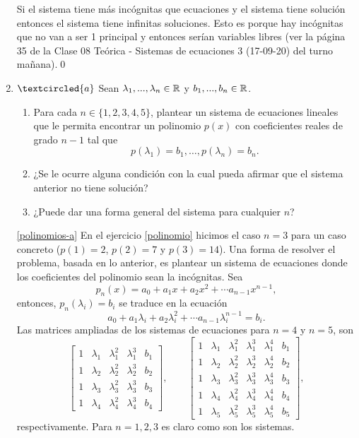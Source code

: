 \begin{enumerate}[topsep=6pt, itemsep=.4cm]
Si el sistema tiene más incógnitas que ecuaciones y el sistema tiene solución entonces el sistema tiene infinitas soluciones. Esto es porque hay incógnitas que no van a ser 1 principal y entonces serían variables libres (ver la página 35 de la Clase 08 Teórica - Sistemas de ecuaciones 3 (17-09-20) del turno mañana).\qed


\item\label{polinomios} $\textcircled{a}$ Sean $\lambda_1, ..., \lambda_n\in\mathbb R$ y $b_1, ..., b_n\in\mathbb R$.
\begin{enumerate}
 \item\label{polinomios-a} Para cada $n\in\{1,2,3,4,5\}$, plantear un sistema de ecuaciones lineales que le permita encontrar un polinomio $p(x)$ con coeficientes reales de grado $n-1$ tal que
 $$
 p(\lambda_1)=b_1, \dots, p(\lambda_n)=b_n.
 $$
\item\label{polinomios-b} ¿Se le ocurre alguna condición con la cual pueda afirmar que el sistema anterior no tiene solución?
\item\label{polinomios-c}  ¿Puede dar una forma general del sistema para cualquier $n$?
\end{enumerate}

\rta

\ref{polinomios-a} En el ejercicio \ref{polinomio} hicimos el caso  $n=3$   para un caso concreto ($p(1)=2$, $p(2) = 7$ y $p(3)=14$). Una forma de resolver el problema, basada en lo anterior, es plantear un sistema de ecuaciones donde los coeficientes del polinomio sean la incógnitas. 
 Sea 
 $$p_n(x) = a_0 + a_1x + a_2x^2 + \cdots a_{n-1}x^{n-1}, $$
 entonces, $p_n(\lambda_i) = b_i$ se traduce en la ecuación
 \begin{equation*}\label{eq-fila-vd}
 a_0 + a_1\lambda_i + a_2\lambda_i^2 + \cdots a_{n-1}\lambda_i^{n-1} = b_i.    
 \end{equation*}
 Las matrices ampliadas de los sistemas de ecuaciones para $n=4$ y $n=5$, son
 \begin{equation*}
     \left[\begin{array}{cccc|c}
     1 &\lambda_1&\lambda_1^2&\lambda_1^3 &b_1 \\
     1 &\lambda_2&\lambda_2^2&\lambda_2^3 &b_2 \\
     1 &\lambda_3&\lambda_3^2&\lambda_3^3 &b_3 \\
     1 &\lambda_4&\lambda_4^2&\lambda_4^3 &b_4
     \end{array}\right], \qquad
     \left[\begin{array}{ccccc|c}
     1 &\lambda_1&\lambda_1^2&\lambda_1^3 &\lambda_1^4 &b_1 \\
     1 &\lambda_2&\lambda_2^2&\lambda_2^3&\lambda_2^4  &b_2 \\
     1 &\lambda_3&\lambda_3^2&\lambda_3^3 &\lambda_3^4 &b_3 \\
     1 &\lambda_4&\lambda_4^2&\lambda_4^3&\lambda_4^4  &b_4\\
     1 &\lambda_5&\lambda_5^2&\lambda_5^3&\lambda_5^4  &b_5
     \end{array}\right], 
 \end{equation*}
 respectivamente. Para $n=1,2,3$ es claro como son los sistemas.
 

\end{enumerate}
